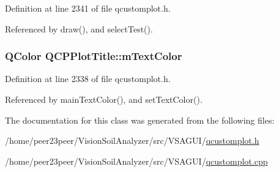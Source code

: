 Definition at line 2341 of file qcustomplot.\+h.



Referenced by draw(), and select\+Test().

\hypertarget{class_q_c_p_plot_title_a5d7f834d6522c1a72fb0682c0b7ebe13}{}
\subsubsection[{m\+Text\+Color}]{\setlength{\rightskip}{0pt plus 5cm}Q\+Color Q\+C\+P\+Plot\+Title\+::m\+Text\+Color\hspace{0.3cm}{\ttfamily [protected]}}\label{class_q_c_p_plot_title_a5d7f834d6522c1a72fb0682c0b7ebe13}


Definition at line 2338 of file qcustomplot.\+h.



Referenced by main\+Text\+Color(), and set\+Text\+Color().



The documentation for this class was generated from the following files\+:\begin{DoxyCompactItemize}
\item 
/home/peer23peer/\+Vision\+Soil\+Analyzer/src/\+V\+S\+A\+G\+U\+I/\hyperlink{qcustomplot_8h}{qcustomplot.\+h}\item 
/home/peer23peer/\+Vision\+Soil\+Analyzer/src/\+V\+S\+A\+G\+U\+I/\hyperlink{qcustomplot_8cpp}{qcustomplot.\+cpp}\end{DoxyCompactItemize}
